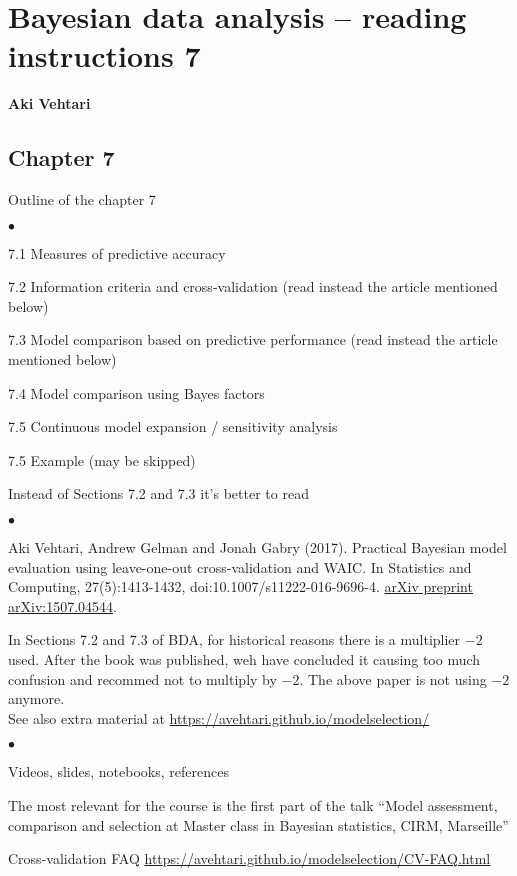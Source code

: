 \documentclass[a4paper,11pt,english]{article}
\begin{document}
\thispagestyle{empty}

\section*{Bayesian data analysis -- reading instructions 7} 
\smallskip
{\bf Aki Vehtari}

\smallskip

\subsection*{Chapter 7}

Outline of the chapter 7
\begin{list}{$\bullet$}{\parsep=0pt\itemsep=2pt}
\item 7.1 Measures of predictive accuracy
\item 7.2 Information criteria and cross-validation (read instead the article mentioned below)
\item 7.3 Model comparison based on predictive performance  (read instead the article mentioned below)
\item 7.4 Model comparison using Bayes factors
\item 7.5 Continuous model expansion / sensitivity analysis
\item 7.5 Example (may be skipped)
\end{list}

\noindent
Instead of Sections 7.2 and 7.3 it's better to read
\begin{list}{$\bullet$}{\parsep=0pt\itemsep=2pt}
\item Aki Vehtari, Andrew Gelman and Jonah Gabry (2017). Practical
  Bayesian model evaluation using leave-one-out cross-validation and
  WAIC. In Statistics and Computing, 27(5):1413-1432,
  doi:10.1007/s11222-016-9696-4. \href{http://arxiv.org/abs/1507.04544}{arXiv preprint arXiv:1507.04544}.
\end{list}

In Sections 7.2 and 7.3 of BDA, for historical reasons there is a multiplier $-2$ used. After the book was published, weh have concluded it causing too much confusion and recommed not to multiply by $-2$. The above paper is not using $-2$ anymore.\\

\noindent
See also  extra material at \url{https://avehtari.github.io/modelselection/}
\begin{list}{$\bullet$}{\parsep=0pt\itemsep=2pt}
\item Videos, slides, notebooks, references
\item The most relevant for the course is the first part of the
  talk ``Model assessment, comparison and selection at Master
  class in Bayesian statistics, CIRM, Marseille''
\item Cross-validation FAQ \url{https://avehtari.github.io/modelselection/CV-FAQ.html}
\end{list}
\end{document}
